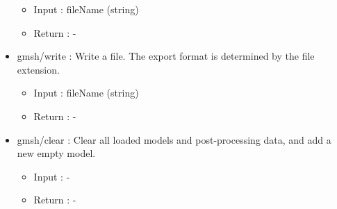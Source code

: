 \documentclass[dvipdfmx, 9pt, a4paper]{article}
\numberwithin{equation}{section}
\begin{document}
\begin{itemize}
\begin{itemize}
\item Input : fileName (string)
\item Return : -
\end{itemize}
\item gmsh/write : Write a file. The export format is determined by the file extension.
\begin{itemize}
\item Input : fileName (string)
\item Return : -
\end{itemize}
\item gmsh/clear : Clear all loaded models and post-processing data, and add a new empty model.
\begin{itemize}
\item Input : -
\item Return : -
\end{itemize}
\end{itemize}
\end{document}
